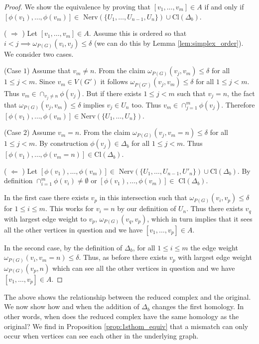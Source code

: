 \documentclass[pdflatex,bst/sn-mathphys-num]{sn-jnl}%
\theoremstyle{thmstyleone}%
\theoremstyle{definition}
\theoremstyle{thmstyletwo}%
\theoremstyle{thmstylethree}%
\begin{document}
\begin{proof}
    We show the equivalence by proving that $[v_1,\dotsc,v_m]\in A$ if and only if $[\phi(v_1),\dotsc,\phi(v_m)]\in$ Nerv$
    \left(\{U_1, \dotsc, U_{n-1},{U}_n\}\right) \cup \text{Cl}(\Delta_b)$.

    ( $\Longrightarrow$ )
    Let $[v_1,\dotsc,v_m]\in A$. Assume this is ordered so that $i<j\implies\omega_{P(G)}(v_i,v_j)\leq \delta$ (we can do this by Lemma \ref{lem:simplex_order}). We consider two cases. 

    (Case $1$) Assume that $v_m\neq n$. From the claim $\omega_{P(G)}(v_j,v_m)\leq \delta$ for all $1\leq j<m$. Since $v_m\in V(G')$ it follows $\omega_{P(G')}(v_j,v_m)\leq \delta$ for all $1\leq j<m$. Thus $v_m\in\cap_{v_j\neq n} \phi(v_j)$. But if there exists $1\leq j<m$ such that $v_j=n$, the fact that $\omega_{P(G)}(v_j,v_m)\leq \delta$ implies $v_j\in U_n$ too. Thus $v_m\in\cap_{j=1}^m \phi(v_j)$. Therefore $[\phi(v_1),\dotsc,\phi(v_m)]\in\text{Nerv}\left(\{U_1,\dotsc,U_n\}\right)$.
    
    (Case $2$) Assume $v_m=n$. From the claim $\omega_{P(G)}(v_j,v_m=n)\leq \delta$ for all $1\leq j<m$. By construction $\phi(v_j)\in \Delta_b$ for all $1\leq j< m$. Thus $[\phi(v_1),\dotsc,\phi(v_m=n)]\in \text{Cl}(\Delta_b)$.

    
    ( $\Longleftarrow$ )
    Let $[\phi(v_1),\dotsc,\phi(v_m)]\in$ Nerv$\left(\{U_1, \dotsc, U_{n-1},{U'}_n\}\right) \cup \text{Cl}(\Delta_b)$. By definition $\cap_{i=1}^m \phi(v_i)\neq \emptyset$ or $[\phi(v_1),\dotsc,\phi(v_m)]\in$ Cl$(\Delta_b)$. 
    
    In the first case there exists $v_p$ in this intersection such that $\omega_{P(G)}(v_i,v_p)\leq \delta$ for $1\leq i\leq m$. This works for $v_i= n$ by our definition of $U_n$. Thus there exists $v_q$ with largest edge weight to $v_p$, $\omega_{P(G)}(v_q,v_p)$, which in turn implies that it sees all the other vertices in question and we have $[v_1,\dotsc,v_p]\in A$.

    In the second case, by the definition of $\Delta_b$, for all $1\leq i\leq m$ the edge weight $\omega_{P(G)}(v_i,v_m=n)\leq \delta$. Thus, as before there exists $v_p$ with largest edge weight $\omega_{P(G)}(v_p,n)$ which can see all the other vertices in question and we have $[v_1,\dotsc,v_p]\in A$.
\end{proof}

The above shows the relationship between the reduced complex and the original. We now show how and when the addition of $\Delta_b$ changes the first homology.
In other words, when does the reduced complex have the same homology as the original? We find in Proposition \ref{prop:1sthom_equiv} that a mismatch can only occur when vertices can see each other in the underlying graph.
\end{document}

